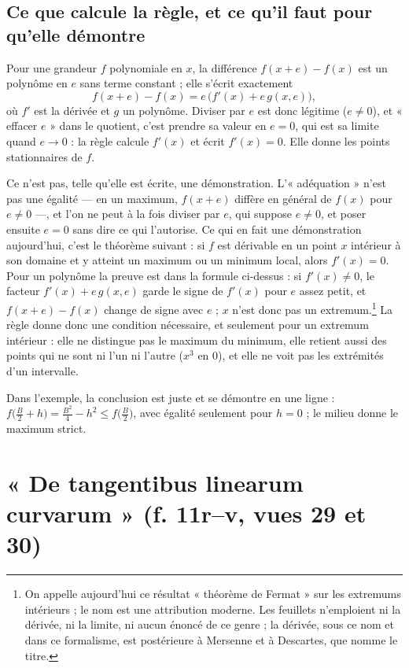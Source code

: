 \documentclass[11pt,a4paper]{article}
\begin{document}
\subsection*{Ce que calcule la règle, et ce qu'il faut pour qu'elle démontre}

Pour une grandeur $f$ polynomiale en $x$, la différence $f(x+e) - f(x)$ est un
polynôme en $e$ sans terme constant ; elle s'écrit exactement
\[ f(x+e) - f(x) = e\,\bigl(f'(x) + e\,g(x,e)\bigr), \]
où $f'$ est la dérivée et $g$ un polynôme. Diviser par $e$ est donc légitime
($e \neq 0$), et « effacer $e$ » dans le quotient, c'est prendre sa valeur en
$e = 0$, qui est sa limite quand $e \to 0$ : la règle calcule $f'(x)$ et écrit
$f'(x) = 0$. Elle donne les points stationnaires de $f$.

Ce n'est pas, telle qu'elle est écrite, une démonstration. L'« adéquation »
n'est pas une égalité — en un maximum, $f(x+e)$ diffère en général de $f(x)$
pour $e \neq 0$ —, et l'on ne peut à la fois diviser par $e$, qui suppose
$e \neq 0$, et poser ensuite $e = 0$ sans dire ce qui l'autorise. Ce qui en
fait une démonstration aujourd'hui, c'est le théorème suivant : si $f$ est
dérivable en un point $x$ intérieur à son domaine et y atteint un maximum ou un
minimum local, alors $f'(x) = 0$. Pour un polynôme la preuve est dans la
formule ci-dessus : si $f'(x) \neq 0$, le facteur $f'(x) + e\,g(x,e)$ garde le
signe de $f'(x)$ pour $e$ assez petit, et $f(x+e) - f(x)$ change de signe avec
$e$ ; $x$ n'est donc pas un extremum.\footnote{On appelle aujourd'hui ce
résultat « théorème de Fermat » sur les extremums intérieurs ; le nom est une
attribution moderne. Les feuillets n'emploient ni la dérivée, ni la limite, ni
aucun énoncé de ce genre ; la dérivée, sous ce nom et dans ce formalisme, est
postérieure à Mersenne et à Descartes, que nomme le titre.} La règle donne donc
une condition nécessaire, et seulement pour un extremum intérieur : elle ne
distingue pas le maximum du minimum, elle retient aussi des points qui ne sont
ni l'un ni l'autre ($x^3$ en $0$), et elle ne voit pas les extrémités d'un
intervalle.

Dans l'exemple, la conclusion est juste et se démontre en une ligne :
$f\bigl(\tfrac B2 + h\bigr) = \tfrac{B^2}{4} - h^2 \leq f\bigl(\tfrac B2\bigr)$,
avec égalité seulement pour $h = 0$ ; le milieu donne le maximum strict.

\section*{« De tangentibus linearum curvarum » (f. 11r–v, vues 29 et 30)}
\end{document}

